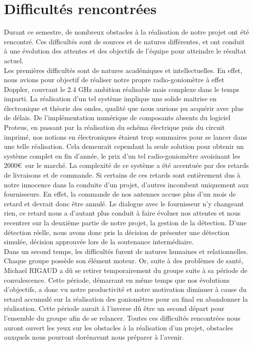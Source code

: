 
\chapter{Difficultés rencontrées}
\label{chap:difficulte}

Durant ce semestre, de nombreux obstacles à la réalisation de notre projet ont été rencontré. Ces difficultés sont de sources et de natures différentes, et ont conduit à une évolution des attentes et des objectifs de l’équipe pour atteindre le résultat actuel.~\\

Les premières difficultés sont de natures académiques et intellectuelles. En effet, nous avions pour objectif de réaliser notre propre radio-goniomètre à effet Doppler, couvrant le 2.4 GHz ambition réalisable mais complexe dans le temps imparti. La réalisation d’un tel système implique une solide maitrise en électronique et théorie des ondes, qualité que nous aurions pu acquérir avec plus de délais. De l’implémentation numérique de composants absents du logiciel Proteus, en passant par la réalisation du schéma électrique puis du circuit imprimé, nos notions en électroniques étaient trop sommaires pour se lancer dans une telle réalisation. Cela demeurait cependant la seule solution pour obtenir un système complet en fin d’année, le prix d’un tel radio-goniomètre avoisinant les 2000\euro ~sur le marché. 
La complexité de ce système a été accentuée par des retards de livraisons et de commande. Si certains de ces retards sont entièrement dus à notre innocence dans la conduite d’un projet, d’autres incombent uniquement aux fournisseurs. En effet, la commande de nos antennes accuse plus d’un mois de retard et devrait donc être annulé. Le dialogue avec le fournisseur n’y changeant rien, ce retard nous a d’autant plus conduit à faire évoluer nos attentes et nous recentrer sur la deuxième partie de notre projet, la gestion de la détection. D’une détection réelle, nous avons donc pris la décision de présenter une détection simulée, décision approuvée lors de la soutenance intermédiaire. 
~\\

Dans un second temps, les difficultés furent de natures humaines et relationnelles. Chaque groupe possède son élément moteur. Or, suite à des problèmes de santé, Michael RIGAUD a dû se retirer temporairement du groupe suite à sa période de convalescence. Cette période, démarrant en même temps que nos évolutions d’objectifs, a donc vu notre productivité et notre motivation diminuer à cause du retard accumulé sur la réalisation des goniomètres pour au final en abandonner la réalisation. Cette période aurait à l’inverse dû être un second départ pour l’ensemble du groupe afin de se relancer. 
Toutes ces difficultés rencontrées nous auront ouvert les yeux sur les obstacles à la réalisation d’un projet, obstacles auxquels nous pourront dorénavant nous préparer à l’avenir.


